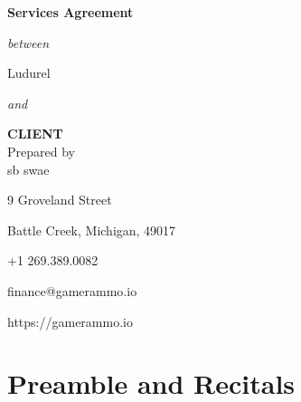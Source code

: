 \documentclass[usletter,11pt]{article} %
\begin{document}
\vspace*{\fill} %

\begin{center}

{\huge \textbf{Services Agreement}}

\small\textit{{between}}

{\Large Ludurel}

\small\textit{{and}}

{\LARGE\textbf{CLIENT}}\\

\vspace{5ex}
Prepared by\\
\vspace{2ex}
sb swae
\vspace{2ex}

9 Groveland Street

Battle Creek, Michigan, 49017

+1 269.389.0082

finance@gamerammo.io

https://gamerammo.io

\end{center}

\vspace*{\fill} %

\newpage
\section{Preamble and Recitals}
\end{document}
